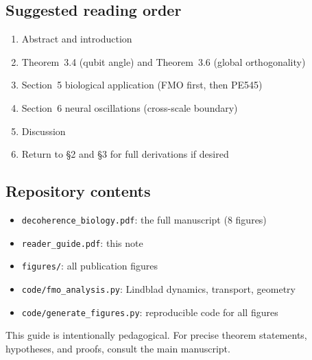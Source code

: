 \documentclass[11pt,a4paper]{article}
\begin{document}
\subsection*{Suggested reading order}

\begin{enumerate}[leftmargin=1.5em]
\item Abstract and introduction
\item Theorem~3.4 (qubit angle) and Theorem~3.6 (global orthogonality)
\item Section~5 biological application (FMO first, then PE545)
\item Section~6 neural oscillations (cross-scale boundary)
\item Discussion
\item Return to \S2 and \S3 for full derivations if desired
\end{enumerate}

\subsection*{Repository contents}

\begin{itemize}[leftmargin=1.5em]
\item \texttt{decoherence\_biology.pdf}: the full manuscript (8 figures)
\item \texttt{reader\_guide.pdf}: this note
\item \texttt{figures/}: all publication figures
\item \texttt{code/fmo\_analysis.py}: Lindblad dynamics, transport, geometry
\item \texttt{code/generate\_figures.py}: reproducible code for all figures
\end{itemize}

\vfill

\begin{center}
\small
This guide is intentionally pedagogical.  For precise theorem statements, hypotheses, and proofs, consult the main manuscript.
\end{center}
\end{document}
